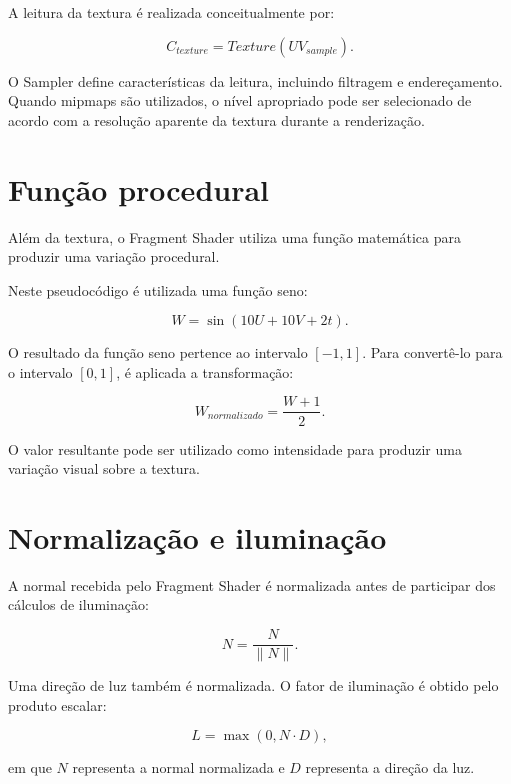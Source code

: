 A leitura da textura é realizada conceitualmente por:

\begin{equation}
C_{texture}=Texture(UV_{sample}).
\end{equation}

O Sampler define características da leitura, incluindo filtragem e
endereçamento. Quando mipmaps são utilizados, o nível apropriado pode ser
selecionado de acordo com a resolução aparente da textura durante a
renderização.


\section{Função procedural}

Além da textura, o Fragment Shader utiliza uma função matemática para
produzir uma variação procedural.

Neste pseudocódigo é utilizada uma função seno:

\begin{equation}
W=\sin(10U+10V+2t).
\end{equation}

O resultado da função seno pertence ao intervalo $[-1,1]$. Para convertê-lo
para o intervalo $[0,1]$, é aplicada a transformação:

\begin{equation}
W_{normalizado}=\frac{W+1}{2}.
\end{equation}

O valor resultante pode ser utilizado como intensidade para produzir uma
variação visual sobre a textura.


\section{Normalização e iluminação}

A normal recebida pelo Fragment Shader é normalizada antes de participar dos
cálculos de iluminação:

\begin{equation}
N=\frac{N}{\|N\|}.
\end{equation}

Uma direção de luz também é normalizada. O fator de iluminação é obtido pelo
produto escalar:

\begin{equation}
L=\max(0,N\cdot D),
\end{equation}

em que $N$ representa a normal normalizada e $D$ representa a direção da luz.

